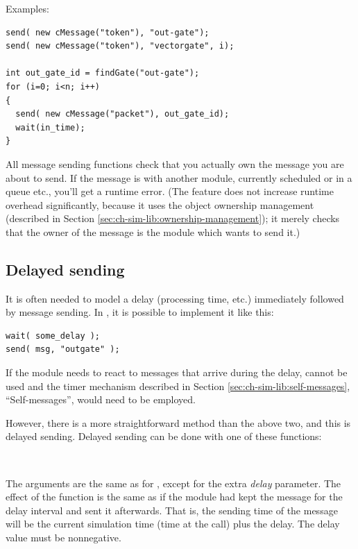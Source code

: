 Examples:

\begin{verbatim}
send( new cMessage("token"), "out-gate");
send( new cMessage("token"), "vectorgate", i);

int out_gate_id = findGate("out-gate");
for (i=0; i<n; i++)
{
  send( new cMessage("packet"), out_gate_id);
  wait(in_time);
}
\end{verbatim}


All message sending functions check that you actually own the message
you are about to send. If the message is with another module,
currently scheduled or in a queue etc., you'll get a runtime error.
(The feature does not increase runtime overhead significantly, because
it uses the object ownership management (described in
Section \ref{sec:ch-sim-lib:ownership-management});
it merely checks that the owner of the message is the module which
wants to send it.)





\subsection{Delayed sending}

It is often needed to model a delay (processing time, etc.) immediately
followed by message sending. In {\opp}, it is possible to implement
it like this:

\begin{verbatim}
wait( some_delay );
send( msg, "outgate" );
\end{verbatim}


If the module needs to react to messages that arrive during the delay,
 cannot be used and the timer mechanism described in
Section \ref{sec:ch-sim-lib:self-messages}, ``Self-messages'', would
need to be employed.


However, there is a more straightforward method than the above two,
and this is delayed sending. Delayed sending
can be done with one of these functions:

\\


The arguments are the same as for , except for the extra \textit{delay}
parameter. The effect of the function is the same as if the module
had kept the message for the delay interval and sent it afterwards.
That is, the sending time of the message will be the current
simulation time (time at the  call) plus the delay.
The delay value must be nonnegative.

